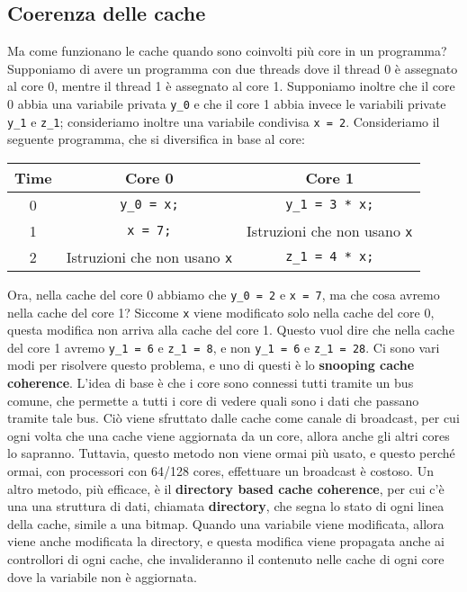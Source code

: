 \subsection{Coerenza delle cache}

Ma come funzionano le cache quando sono coinvolti più core in un programma? Supponiamo di avere un programma con due threads dove il thread 0 è assegnato al core 0, mentre il thread 1 è assegnato al core 1. Supponiamo inoltre che il core 0 abbia una variabile privata \verb|y_0| e che il core 1 abbia invece le variabili private \verb|y_1| e \verb|z_1|; consideriamo inoltre una variabile condivisa \verb|x = 2|. Consideriamo il seguente programma, che si diversifica in base al core:

\begin{center}
    \begin{tabular}{|c||c|c|}
        \hline
        Time & Core 0 & Core 1 \\
        \hline\hline
        0 & \verb|y_0 = x;| & \verb|y_1 = 3 * x;| \\
        \hline
        1 & \verb|x = 7;| & Istruzioni che non usano \verb|x| \\
        \hline
        2 & Istruzioni che non usano \verb|x| & \verb|z_1 = 4 * x;| \\
        \hline
    \end{tabular}
\end{center}

Ora, nella cache del core 0 abbiamo che \verb|y_0 = 2| e \verb|x = 7|, ma che cosa avremo nella cache del core 1? Siccome \verb|x| viene modificato solo nella cache del core 0, questa modifica non arriva alla cache del core 1. Questo vuol dire che nella cache del core 1 avremo \verb|y_1 = 6| e \verb|z_1 = 8|, e non \verb|y_1 = 6| e \verb|z_1 = 28|.
\nwl
Ci sono vari modi per risolvere questo problema, e uno di questi è lo \textbf{snooping cache coherence}. L'idea di base è che i core sono connessi tutti tramite un bus comune, che permette a tutti i core di vedere quali sono i dati che passano tramite tale bus. Ciò viene sfruttato dalle cache come canale di broadcast, per cui ogni volta che una cache viene aggiornata da un core, allora anche gli altri cores lo sapranno. Tuttavia, questo metodo non viene ormai più usato, e questo perché ormai, con processori con 64/128 cores, effettuare un broadcast è costoso.
\nwl
Un altro metodo, più efficace, è il \textbf{directory based cache coherence}, per cui c'è una una struttura di dati, chiamata \textbf{directory}, che segna lo stato di ogni linea della cache, simile a una bitmap. Quando una variabile viene modificata, allora viene anche modificata la directory, e questa modifica viene propagata anche ai controllori di ogni cache, che invalideranno il contenuto nelle cache di ogni core dove la variabile non è aggiornata.

